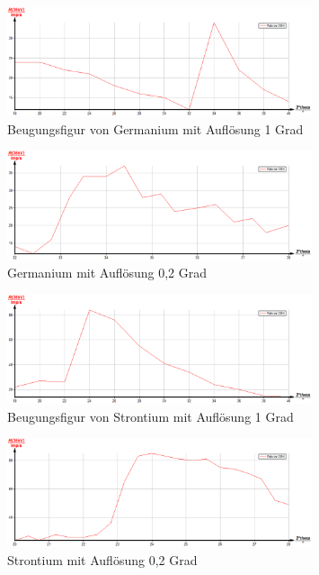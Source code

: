 \begin{figure}[H]
\includegraphics[width=0.8\textwidth] {pics/germanium01.png}
\centering
\caption{Beugungsfigur von Germanium mit Auflösung 1 Grad}
\label{Aufbau}
\end{figure}

\begin{figure}[H]
\includegraphics[width=0.8\textwidth] {pics/germanium02.png}
\centering
\caption{Germanium mit Auflösung 0,2 Grad}
\label{Aufbau}
\end{figure}

\begin{figure}[H]
\includegraphics[width=0.8\textwidth] {pics/strontium01.png}
\centering
\caption{Beugungsfigur von Strontium mit Auflösung 1 Grad}
\label{Aufbau}
\end{figure}

\begin{figure}[H]
\includegraphics[width=0.8\textwidth] {pics/strontium02.png}
\centering
\caption{Strontium mit Auflösung 0,2 Grad}
\label{Aufbau}
\end{figure}

